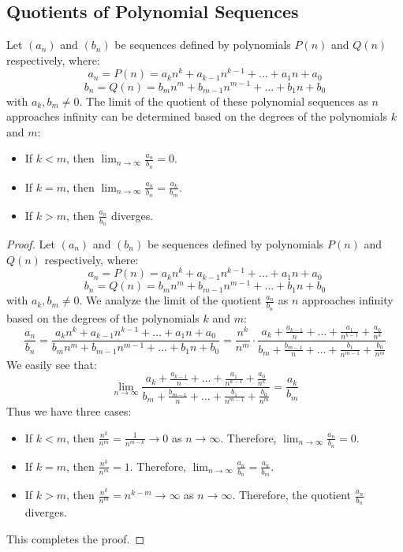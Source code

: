 \subsection{Quotients of Polynomial Sequences}
\begin{theorem}
    Let \( (a_n) \) and \( (b_n) \) be sequences defined by polynomials \( P(n) \) and \( Q(n) \) respectively, where:
    \[
    a_n = P(n) = a_k n^k + a_{k-1} n^{k-1} + \ldots + a_1 n + a_0
    \]
    \[
    b_n = Q(n) = b_m n^m + b_{m-1} n^{m-1} + \ldots + b_1 n + b_0
    \]
    with \( a_k, b_m \neq 0 \). The limit of the quotient of these polynomial sequences as \( n \) approaches infinity can be determined based on the degrees of the polynomials \( k \) and \( m \):
    \begin{itemize}[itemsep=1pt,label=$\circ$]
        \item If \( k < m \), then \( \lim_{n \to \infty} \frac{a_n}{b_n} = 0 \).
        \item If \( k = m \), then \( \lim_{n \to \infty} \frac{a_n}{b_n} = \frac{a_k}{b_m} \).
        \item If \( k > m \), then \( \frac{a_n}{b_n} \) diverges.
    \end{itemize}
\end{theorem}
\begin{proof}
    Let \( (a_n) \) and \( (b_n) \) be sequences defined by polynomials \( P(n) \) and \( Q(n) \) respectively, where:
    \[
    a_n = P(n) = a_k n^k + a_{k-1} n^{k-1} + \ldots + a_1 n + a_0
    \]
    \[
    b_n = Q(n) = b_m n^m + b_{m-1} n^{m-1} + \ldots + b_1 n + b_0
    \]
    with \( a_k, b_m \neq 0 \). We analyze the limit of the quotient \( \frac{a_n}{b_n} \) as \( n \) approaches infinity based on the degrees of the polynomials \( k \) and \( m \):
    \[
        \frac{a_n}{b_n} = \frac{a_k n^k + a_{k-1} n^{k-1} + \ldots + a_1 n + a_0}{b_m n^m + b_{m-1} n^{m-1} + \ldots + b_1 n + b_0} = \frac{n^k}{n^m} \cdot \frac{a_k + \frac{a_{k-1}}{n} + \ldots + \frac{a_1}{n^{k-1}} + \frac{a_0}{n^k}}{b_m + \frac{b_{m-1}}{n} + \ldots + \frac{b_1}{n^{m-1}} + \frac{b_0}{n^m}}
    \]
    We easily see that:
    \[
        \lim_{n \to \infty} \frac{a_k + \frac{a_{k-1}}{n} + \ldots + \frac{a_1}{n^{k-1}} + \frac{a_0}{n^k}}{b_m + \frac{b_{m-1}}{n} + \ldots + \frac{b_1}{n^{m-1}} + \frac{b_0}{n^m}} = \frac{a_k}{b_m}
    \]
    Thus we have three cases:
    \begin{itemize}[itemsep=1pt,label=$\circ$]
        \item If \( k < m \), then \( \frac{n^k}{n^m} = \frac{1}{n^{m-k}} \to 0 \) as \( n \to \infty \). Therefore, \( \lim_{n \to \infty} \frac{a_n}{b_n} = 0 \).
        \item If \( k = m \), then \( \frac{n^k}{n^m} = 1 \). Therefore, \( \lim_{n \to \infty} \frac{a_n}{b_n} = \frac{a_k}{b_m} \).
        \item If \( k > m \), then \( \frac{n^k}{n^m} = n^{k-m} \to \infty \) as \( n \to \infty \). Therefore, the quotient \( \frac{a_n}{b_n} \) diverges.
    \end{itemize}
    This completes the proof.
\end{proof}

